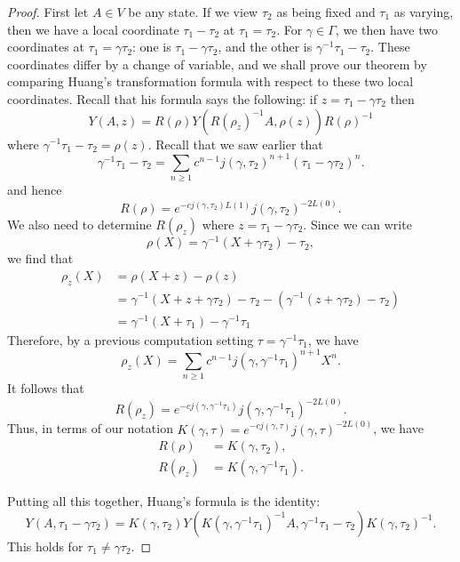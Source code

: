 \documentclass[12pt]{amsart}
\theoremstyle{plain}
\theoremstyle{definition}
\theoremstyle{remark}
\begin{document}
\begin{proof}
    First let $A\in V$ be any state. If we view $\tau_2$ as being fixed and $\tau_1$ as varying, then we have a local coordinate $\tau_1-\tau_2$ at $\tau_1=\tau_2$. For $\gamma \in \Gamma$, we then have two coordinates at $\tau_1 = \gamma \tau_2$: one is $\tau_1 - \gamma \tau_2$, and the other is $\gamma^{-1}\tau_1 - \tau_2$.  These coordinates differ by a change of variable, and we shall prove our theorem by comparing Huang's transformation formula with respect to these two local coordinates. Recall that his formula says the following: if $z = \tau_1-\gamma \tau_2$ then 
    \[
     Y(A,z) = R(\rho)Y(R(\rho_z)^{-1}A,\rho(z))R(\rho)^{-1}
    \]
    where $\gamma^{-1}\tau_1-\tau_2 = \rho(z)$. Recall that we saw earlier that
    \[
    \gamma^{-1}\tau_1-\tau_2 = \sum_{n\geq 1} c^{n-1}j(\gamma,\tau_2)^{n+1}(\tau_1-\gamma\tau_2)^n.
    \]
   and hence
    \[
    R(\rho) = e^{-cj(\gamma,\tau_2)L(1)}j(\gamma,\tau_2)^{-2L(0)}.
    \]
    We also need to determine $R(\rho_z)$ where $z = \tau_1-\gamma\tau_2$. Since we can write 
    \[\rho(X) = \gamma^{-1}(X+\gamma \tau_2)-\tau_2,\] 
    we find that
    \begin{align*}
        \rho_z(X) &=\rho(X+z)-\rho(z)\\
        &= \gamma^{-1}(X+z+\gamma \tau_2)-\tau_2 - (\gamma^{-1}(z+\gamma\tau_2) - \tau_2)\\
        &=\gamma^{-1}(X+\tau_1) - \gamma^{-1}\tau_1
    \end{align*}
    Therefore, by a previous computation setting $\tau = \gamma^{-1}\tau_1$, we have
    \[
        \rho_z(X) = \sum_{n\geq 1} c^{n-1}j(\gamma, \gamma^{-1}\tau_1)^{n+1}X^n.
    \]
    It follows that
    \[
      R(\rho_z) = e^{-cj(\gamma,\gamma^{-1}\tau_1)}j(\gamma,\gamma^{-1}\tau_1)^{-2L(0)}.
    \]
    Thus, in terms of our notation $K(\gamma,\tau) = e^{-cj(\gamma,\tau)}j(\gamma,\tau)^{-2L(0)}$, we have
    \begin{align*}
    R(\rho) &= K(\gamma, \tau_2),\\
    R(\rho_z) &= K(\gamma,\gamma^{-1}\tau_1).
    \end{align*}
    
    Putting all this together, Huang's formula is the identity:
    \begin{equation}
        \label{eq:huang1}
        Y(A,\tau_1-\gamma \tau_2) = K(\gamma, \tau_2)Y(K(\gamma,\gamma^{-1}\tau_1)^{-1}A,\gamma^{-1}\tau_1-\tau_2) K(\gamma,\tau_2)^{-1}.
    \end{equation}
    This holds for $\tau_1\neq \gamma \tau_2$.


\end{proof}
\end{document}
